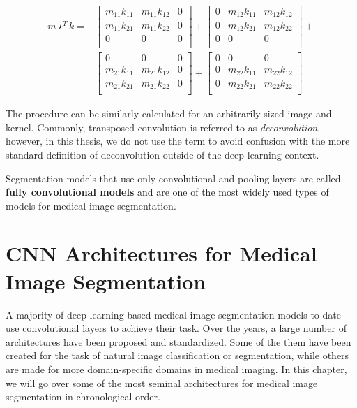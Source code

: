 \begin{align*}
m \star^T k = & 
\begin{bmatrix}
m_{11}k_{11} & m_{11}k_{12} & 0\\
m_{11}k_{21} & m_{11}k_{22} & 0\\
0 & 0 & 0\\
\end{bmatrix}
+
\begin{bmatrix}
0 & m_{12}k_{11} & m_{12}k_{12}\\
0 & m_{12}k_{21} & m_{12}k_{22}\\
0 & 0 & 0\\
\end{bmatrix}
+\\
&
\begin{bmatrix}
0 & 0 & 0\\
m_{21}k_{11} & m_{21}k_{12} & 0\\
m_{21}k_{21} & m_{21}k_{22} & 0\\
\end{bmatrix}
+
\begin{bmatrix}
0 & 0 & 0\\
0 & m_{22}k_{11} & m_{22}k_{12}\\
0 & m_{22}k_{21} & m_{22}k_{22}\\
\end{bmatrix}
\end{align*}

The procedure can be similarly calculated for an arbitrarily sized image and kernel. Commonly, transposed convolution is referred to as \textit{deconvolution}, however, in this thesis, we do not use the term to avoid confusion with the more standard definition of deconvolution outside of the deep learning context.

Segmentation models that use only convolutional and pooling layers are called \textbf{fully convolutional models} and are one of the most widely used types of models for medical image segmentation.

\section{CNN Architectures for Medical Image Segmentation}

A majority of deep learning-based medical image segmentation models to date use convolutional layers to achieve their task. Over the years, a large number of architectures have been proposed and standardized. Some of the them have been created for the task of natural image classification or segmentation, while others are made for more domain-specific domains in medical imaging. In this chapter, we will go over some of the most seminal architectures for medical image segmentation in chronological order.


